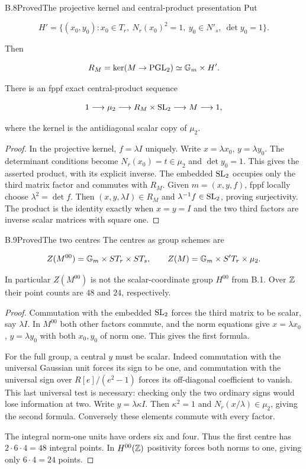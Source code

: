 \begin{statement}{B.8}{Proved}{The projective kernel and central-product presentation}
Put

$$
H'=\{(x_0,y_0):x_0\in T_r,\ N_r(x_0)^2=1,\
                 y_0\in N'_s,\ \det y_0=1\}.
$$

Then

$$
R_M=\ker(M\to\operatorname{PGL}_2)\simeq\mathbb G_m\times H'.
$$

There is an fppf exact central-product sequence

$$
1\longrightarrow\mu_2\longrightarrow R_M\times\operatorname{SL}_2
 \longrightarrow M\longrightarrow1,
$$

where the kernel is the antidiagonal scalar copy of $\mu_2$.
\end{statement}
\begin{proof}
In the projective kernel, $f=\lambda I$ uniquely.
Write $x=\lambda x_0$, $y=\lambda y_0$.
The determinant conditions become
$N_r(x_0)=t\in\mu_2$ and $\det y_0=1$.
This gives the asserted product, with its explicit inverse.
The embedded $\operatorname{SL}_2$ occupies only the third matrix factor
and commutes with $R_M$.
Given $m=(x,y,f)$, fppf locally choose $\lambda^2=\det f$.
Then $(x,y,\lambda I)\in R_M$ and
$\lambda^{-1}f\in\operatorname{SL}_2$, proving surjectivity.
The product is the identity exactly when $x=y=I$ and the
two third factors are inverse scalar matrices with square one.
\end{proof}

\begin{statement}{B.9}{Proved}{The two centres}
The centres as group schemes are

$$
Z(M^{00})=\mathbb G_m\times ST_r\times ST_s,
 \qquad
 Z(M)=\mathbb G_m\times S'T_r\times\mu_2.
$$

In particular $Z(M^{00})$ is not the scalar-coordinate group
$H^{00}$ from B.1. Over $\mathbb Z$ their point counts are
$48$ and $24$, respectively.
\end{statement}
\begin{proof}
Commutation with the embedded $\operatorname{SL}_2$ forces the third
matrix to be scalar, say $\lambda I$.
In $M^{00}$ both other factors commute, and the norm equations
give $x=\lambda x_0$, $y=\lambda y_0$ with both $x_0,y_0$
of norm one. This gives the first formula.

For the full group, a central $y$ must be scalar.
Indeed commutation with the universal Gaussian unit forces
its sign to be one, and commutation with the universal sign
over $R[e]/(e^2-1)$ forces its off-diagonal coefficient to
vanish. This last universal test is necessary: checking only
the two ordinary signs would lose information at two.
Write $y=\lambda\kappa I$. Then $\kappa^2=1$ and
$N_r(x/\lambda)\in\mu_2$, giving the second formula.
Conversely these elements commute with every factor.

The integral norm-one units have orders six and four.
Thus the first centre has $2\cdot6\cdot4=48$ integral points.
In $H^{00}(\mathbb Z)$ positivity forces both norms to one,
giving only $6\cdot4=24$ points.
\end{proof}

